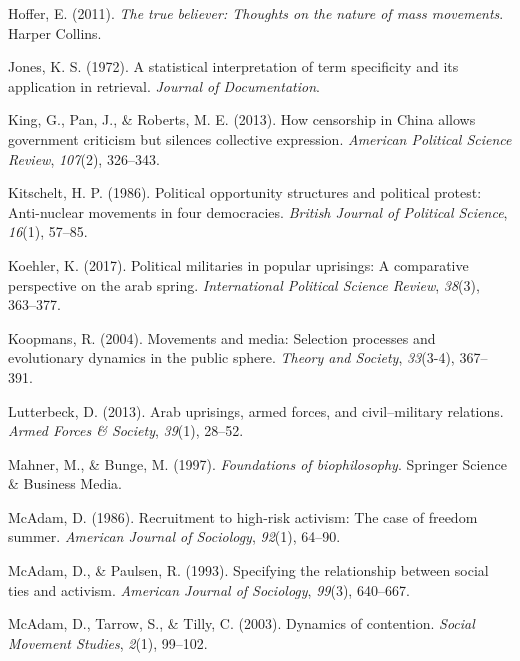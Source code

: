 \documentclass[english,man]{apa6}
\begin{document}
\leavevmode\hypertarget{ref-Hoffer2011true}{}%
Hoffer, E. (2011). \emph{The true believer: Thoughts on the nature of mass movements}. Harper Collins.

\leavevmode\hypertarget{ref-jones1972statistical}{}%
Jones, K. S. (1972). A statistical interpretation of term specificity and its application in retrieval. \emph{Journal of Documentation}.

\leavevmode\hypertarget{ref-king2013censorship}{}%
King, G., Pan, J., \& Roberts, M. E. (2013). How censorship in China allows government criticism but silences collective expression. \emph{American Political Science Review}, \emph{107}(2), 326--343.

\leavevmode\hypertarget{ref-kitschelt1986political}{}%
Kitschelt, H. P. (1986). Political opportunity structures and political protest: Anti-nuclear movements in four democracies. \emph{British Journal of Political Science}, \emph{16}(1), 57--85.

\leavevmode\hypertarget{ref-koehler2017political}{}%
Koehler, K. (2017). Political militaries in popular uprisings: A comparative perspective on the arab spring. \emph{International Political Science Review}, \emph{38}(3), 363--377.

\leavevmode\hypertarget{ref-koopmans2004movements}{}%
Koopmans, R. (2004). Movements and media: Selection processes and evolutionary dynamics in the public sphere. \emph{Theory and Society}, \emph{33}(3-4), 367--391.

\leavevmode\hypertarget{ref-lutterbeck2013arab}{}%
Lutterbeck, D. (2013). Arab uprisings, armed forces, and civil--military relations. \emph{Armed Forces \& Society}, \emph{39}(1), 28--52.

\leavevmode\hypertarget{ref-mahner1997foundations}{}%
Mahner, M., \& Bunge, M. (1997). \emph{Foundations of biophilosophy}. Springer Science \& Business Media.

\leavevmode\hypertarget{ref-mcadam1986recruitment}{}%
McAdam, D. (1986). Recruitment to high-risk activism: The case of freedom summer. \emph{American Journal of Sociology}, \emph{92}(1), 64--90.

\leavevmode\hypertarget{ref-mcadam1993specifying}{}%
McAdam, D., \& Paulsen, R. (1993). Specifying the relationship between social ties and activism. \emph{American Journal of Sociology}, \emph{99}(3), 640--667.

\leavevmode\hypertarget{ref-mcadam2003dynamics}{}%
McAdam, D., Tarrow, S., \& Tilly, C. (2003). Dynamics of contention. \emph{Social Movement Studies}, \emph{2}(1), 99--102.
\end{document}
